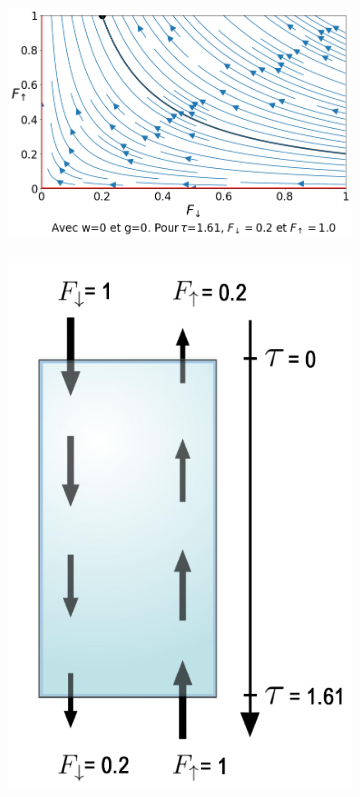 \documentclass[12pt]{article}
\begin{document}
\begin{figure}[H]
    \centering
    \begin{subfigure}{0.59\textwidth}
      \centering
      \includegraphics[width=1\textwidth]{Graphe/Figure W=0.png}
      \captionsetup{width=.85\textwidth}
      \caption{}  
      \label{fig:Sub_Graphe_W=0}
    \end{subfigure}%
    \begin{subfigure}{0.3\textwidth}
        \centering
        \captionsetup{width=1.4\textwidth}
        \includegraphics[width=1\textwidth]{Schema/W=0.png}

\end{subfigure}
\end{figure}
\end{document}
